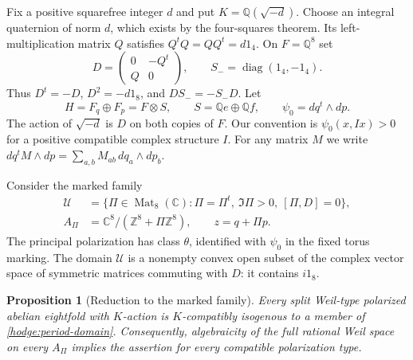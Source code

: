 \documentclass[11pt]{article}
\newtheorem{proposition}[theorem]{Proposition}
\theoremstyle{definition}
\theoremstyle{remark}
\newcommand{\Q}{\mathbb Q}
\numberwithin{equation}{section}
\begin{document}
Fix a positive squarefree integer $d$ and put $K=\mathbb Q(\sqrt{-d})$.
Choose an integral quaternion of norm $d$, which exists by the four-squares
theorem.  Its left-multiplication matrix $Q$ satisfies
$Q^tQ=QQ^t=d1_4$.  On $F=\mathbb Q^8$ set
\begin{equation}
 D=\begin{pmatrix}0&-Q^t\\Q&0\end{pmatrix},
 \qquad S_-=\operatorname{diag}(1_4,-1_4).
 \label{hodge:matrices}
\end{equation}
Thus $D^t=-D$, $D^2=-d1_8$, and $DS_-=-S_-D$.
Let
\[
 H=F_q\oplus F_p=F\otimes S,
 \qquad S=\mathbb Q e\oplus\mathbb Q f,
 \qquad \psi_0=dq^t\wedge dp.
\]
The action of $\sqrt{-d}$ is $D$ on both copies of $F$.  Our convention is
$\psi_0(x,Ix)>0$ for a positive compatible complex structure $I$.
For any matrix $M$ we write
$dq^tM\wedge dp=\sum_{a,b}M_{ab}\,dq_a\wedge dp_b$.

Consider the marked family
\begin{equation}
 \begin{split}
 \mathcal U&=\{\Pi\in\operatorname{Mat}_8(\mathbb C):
       \Pi=\Pi^t,\ \Im\Pi>0,\ [\Pi,D]=0\},\\
 A_\Pi&=\mathbb C^8/(\mathbb Z^8+\Pi\mathbb Z^8),\qquad z=q+\Pi p.
 \end{split}
 \label{hodge:period-domain}
\end{equation}
The principal polarization has class $\theta$, identified with $\psi_0$
in the fixed torus marking.  The domain $\mathcal U$ is a nonempty convex
open subset of the complex vector space of symmetric matrices commuting
with $D$: it contains $i1_8$.

\begin{proposition}[Reduction to the marked family]
\label{hodge:isogeny-reduction}
Every split Weil-type polarized abelian eightfold with $K$-action is
$K$-compatibly isogenous to a member of \eqref{hodge:period-domain}.
Consequently, algebraicity of the full rational Weil space on every
$A_\Pi$ implies the assertion for every compatible polarization type.
\end{proposition}
\end{document}
